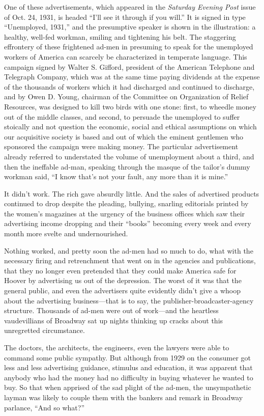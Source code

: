 \documentclass[openany,nobib]{tufte-book}
\begin{document}
One of these advertisements, which appeared in the \emph{Saturday
Evening Post} issue of Oct. 24, 1931, is headed ``I'll see it through if
you will.'' It is signed in type ``Unemployed, 1931,'' and the
presumptive speaker is shown in the illustration: a healthy, well-fed
workman, smiling and tightening his belt. The staggering effrontery of
these frightened ad-men in presuming to speak for the unemployed workers
of America can scarcely be characterized in temperate language. This
campaign signed by Walter S. Gifford, president of the American
Telephone and Telegraph Company, which was at the same time paying
dividends at the expense of the thousands of workers which it had
discharged and continued to discharge, and by Owen D. Young, chairman of
the Committee on Organization of Relief Resources, was designed to kill
two birds with one stone: first, to wheedle money out of the middle
classes, and second, to persuade the unemployed to suffer stoically and
not question the economic, social and ethical assumptions on which our
acquisitive society is based and out of which the eminent gentlemen who
sponsored the campaign were making money. The particular advertisement
already referred to understated the volume of unemployment about a
third, and then the ineffable ad-man, speaking through the masque of the
tailor's dummy workman said, ``I know that's not your fault, any more
than it is mine.''

It didn't work. The rich gave absurdly little. And the sales of
advertised products continued to drop despite the pleading, bullying,
snarling editorials printed by the women's magazines at the urgency of
the business offices which saw their advertising income dropping and
their ``books'' becoming every week and every month more svelte and
undernourished.

Nothing worked, and pretty soon the ad-men had so much to do, what with
the necessary firing and retrenchment that went on in the agencies and
publications, that they no longer even pretended that they could make
America safe for Hoover by advertising us out of the depression. The
worst of it was that the general public, and even the advertisers quite
evidently didn't give a whoop about the advertising business---that is
to say, the publisher-broadcaster-agency structure. Thousands of ad-men
were out of work---and the heartless vaudevillians of Broadway sat up
nights thinking up cracks about this unregretted circumstance.

The doctors, the architects, the engineers, even the lawyers were able
to command some public sympathy. But although from 1929 on the consumer
got less and less advertising guidance, stimulus and education, it was
apparent that anybody who had the money had no difficulty in buying
whatever he wanted to buy. So that when apprised of the sad plight of
the ad-men, the unsympathetic layman was likely to couple them with the
bankers and remark in Broadway parlance, ``And so what?''
\end{document}

